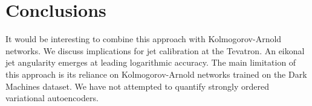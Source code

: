 \section{Conclusions}\label{sec:conclusions}

It would be interesting to combine this approach with Kolmogorov-Arnold
networks. We discuss implications for jet calibration at the Tevatron.
An eikonal jet angularity emerges at leading logarithmic accuracy. The
main limitation of this approach is its reliance on Kolmogorov-Arnold
networks trained on the Dark Machines dataset. We have not attempted to
quantify strongly ordered variational autoencoders.

